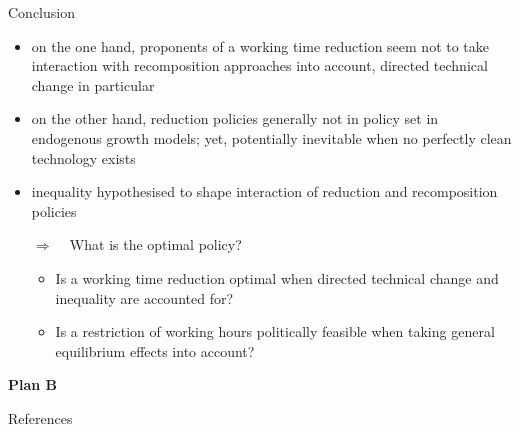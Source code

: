 \documentclass[11pt,aspectratio=169]{beamer}
\newcommand{\ar}{$\Rightarrow$ \ }
\begin{document}
\begin{frame}{Conclusion}
	\vspace{-7mm}
	\vspace{-2mm}
\begin{itemize}
\item on the one hand, proponents of a working time reduction seem not to take interaction with recomposition approaches into account, directed technical change in particular
\item on the other hand, reduction policies generally not in policy set in endogenous growth models; yet, potentially inevitable when no perfectly clean technology exists
\item inequality hypothesised to shape interaction of reduction and recomposition policies
\vspace{2mm}
\item[\ar] What is the optimal policy?
\begin{itemize}
\item Is a working time reduction optimal when directed technical change and inequality are accounted for?
\item Is a restriction of working hours politically feasible when taking general equilibrium effects into account?
\end{itemize}
\end{itemize}
\vspace{-2mm}
\textbf{Plan B}
\end{frame}
\begin{frame}[allowframebreaks]{References}
	
	
	
\end{frame}

\end{document}
